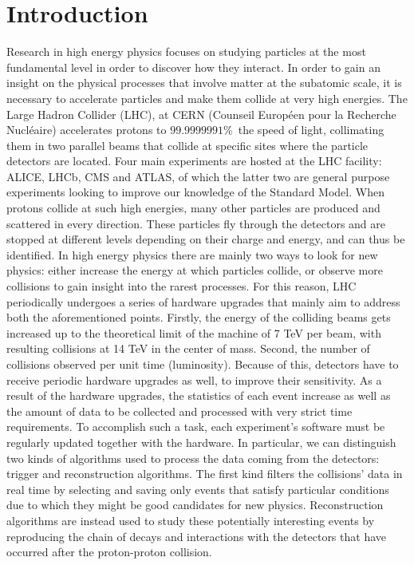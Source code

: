 \chapter*{Introduction}
Research in high energy physics focuses on studying particles at the most fundamental level in order to discover how they interact. In order to gain an insight on the physical processes that involve matter at the subatomic scale, it is necessary to accelerate particles and make them collide at very high energies. The Large Hadron Collider (LHC), at CERN (Counseil Européen pour la Recherche Nucléaire) accelerates protons to $99.9999991\%$~the speed of light, collimating them in two parallel beams that collide at specific sites where the particle detectors are located. Four main experiments are hosted at the LHC facility: ALICE, LHCb, CMS and ATLAS, of which the latter two are general purpose experiments looking to improve our knowledge of the Standard Model. When protons collide at such high energies, many other particles are produced and scattered in every direction. These particles fly through the detectors and are stopped at different levels depending on their charge and energy, and can thus be identified. In high energy physics there are mainly two ways to look for new physics: either increase the energy at which particles collide, or observe more collisions to gain insight into the rarest processes. For this reason, LHC periodically undergoes a series of hardware upgrades that mainly  aim to address both the aforementioned points. Firstly, the energy of the colliding beams gets increased up to the theoretical limit of the machine of 7 TeV per beam, with resulting collisions at 14 TeV in the center of mass. Second, the number of collisions observed per unit time (luminosity). Because of this, detectors have to receive periodic hardware upgrades as well, to improve their sensitivity. As a result of the hardware upgrades, the statistics of each event increase as well as the amount of data to be collected and processed with very strict time requirements. To accomplish such a task, each experiment's software must be regularly updated together with the hardware. In particular, we can distinguish two kinds of algorithms used to process the data coming from the detectors: trigger and reconstruction algorithms. The first kind filters the collisions' data in real time by selecting and saving only events that satisfy particular conditions due to which they might be good candidates for new physics. Reconstruction algorithms are instead used to study these potentially interesting events by reproducing the chain of decays and interactions with the detectors that have occurred after the proton-proton collision. \newline
